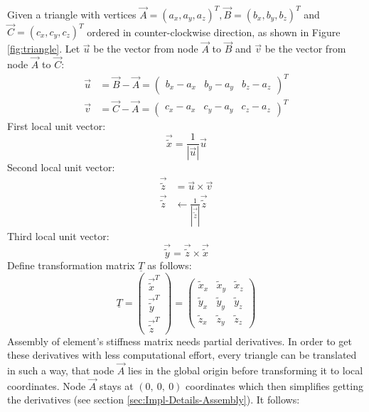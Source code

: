   Given a triangle with vertices $\vec{A} = (a_x, a_y, a_z)^T, \vec{B} = (b_x, b_y, b_z)^T$ and $\vec{C} = (c_x, c_y, c_z)^T$ ordered in counter-clockwise direction, as shown in Figure \ref{fig:triangle}. Let $\vec{u}$ be the vector from node $\vec{A}$ to $\vec{B}$ and $\vec{v}$ be the vector from node $\vec{A}$ to $\vec{C}$:
  \begin{align*}
  \vec{u} &= \vec{B}-\vec{A} = \begin{pmatrix}
  b_x - a_x & b_y - a_y & b_z - a_z
  \end{pmatrix}^T\\
  \vec{v} &= \vec{C}-\vec{A} = \begin{pmatrix}
  c_x - a_x & c_y - a_y & c_z - a_z
  \end{pmatrix}^T
  \end{align*}
  First local unit vector:
  \begin{equation*}
   \vec{\tilde{x}} = \frac{1}{\left|\vec{u}\right|}\vec{u}
  \end{equation*}
  Second local unit vector:
  \begin{align*}
   \vec{\tilde{z}} &= \vec{u} \times \vec{v} \\
   \vec{\tilde{z}} &\leftarrow \frac{1}{\left|\vec{\tilde{z}}\right|}\vec{\tilde{z}}
  \end{align*}
  Third local unit vector:
  \begin{equation*}
   \vec{\tilde{y}} = \vec{\tilde{z}} \times \vec{\tilde{x}}
  \end{equation*}
  Define transformation matrix $\underline{T}$ as follows:
  \begin{equation}\label{eq:trafoT_tri}
   \underline{T} = \begin{pmatrix}
   \vec{\tilde{x}}^T\\ \vec{\tilde{y}}^T\\ \vec{\tilde{z}}^T
   \end{pmatrix} = \begin{pmatrix}
   \tilde{x}_x & \tilde{x}_y & \tilde{x}_z\\
   \tilde{y}_x & \tilde{y}_y & \tilde{y}_z\\
   \tilde{z}_x & \tilde{z}_y & \tilde{z}_z
   \end{pmatrix}
  \end{equation}
  Assembly of element's stiffness matrix needs partial derivatives. In order to get these derivatives with less computational effort, every triangle can be translated in such a way, that node $\vec{A}$ lies in the global origin before transforming it to local coordinates. Node $\vec{A}$ stays at $(0,\ 0,\ 0)$ coordinates which then simplifies getting the derivatives (see section \ref{sec:Impl-Details-Assembly}). It follows:
